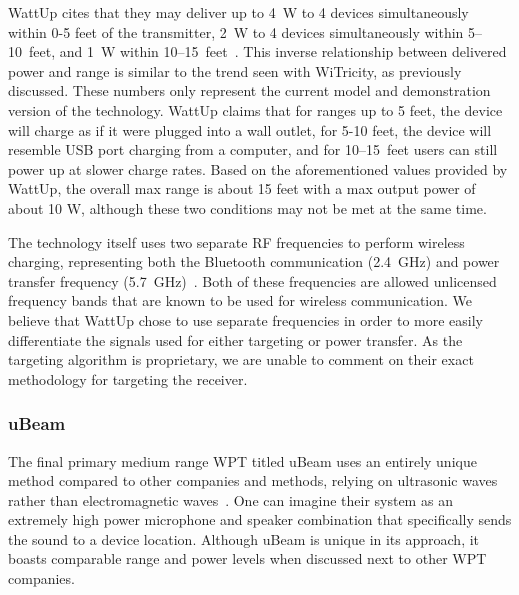 WattUp cites that they may deliver up to 4~W to 4 devices simultaneously within 0-5 feet of the transmitter, 2~W to 4 devices simultaneously within \numrange{5}{10}~feet, and 1~W within \numrange{10}{15}~feet~\cite{energouscorporation2016}. This inverse relationship between delivered power and range is similar to the trend seen with WiTricity, as previously discussed. These numbers only represent the current model and demonstration version of the technology. WattUp claims that for ranges up to 5 feet, the device will charge as if it were plugged into a wall outlet, for 5-10 feet, the device will resemble USB port charging from a computer, and for \numrange{10}{15}~feet users can still power up at slower charge rates. Based on the aforementioned values provided by WattUp, the overall max range is about 15 feet with a max output power of about 10 W, although these two conditions may not be met at the same time.

The technology itself uses two separate RF frequencies to perform wireless charging, representing both the Bluetooth communication (2.4~GHz) and power transfer frequency (5.7~GHz)~\cite{energouscorporation2016}. Both of these frequencies are allowed unlicensed frequency bands that are known to be used for wireless communication. We believe that WattUp chose to use separate frequencies in order to more easily differentiate the signals used for either targeting or power transfer. As the targeting algorithm is proprietary, we are unable to comment on their exact methodology for targeting the receiver.

\subsubsection{uBeam}
The final primary medium range WPT titled uBeam uses an entirely unique method compared to other companies and methods, relying on ultrasonic waves rather than electromagnetic waves~\cite{constine_ubeam_2015}. One can imagine their system as an extremely high power microphone and speaker combination that specifically sends the sound to a device location. Although uBeam is unique in its approach, it boasts comparable range and power levels when discussed next to other WPT companies.

